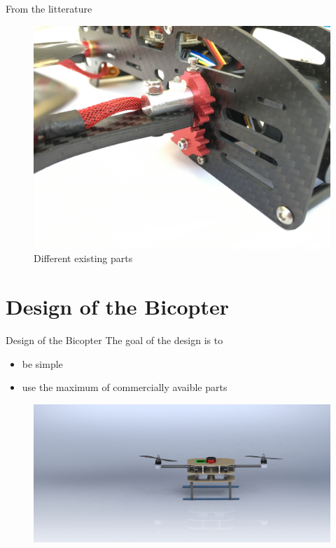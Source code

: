 \documentclass{beamer}
\begin{document}
\begin{frame}{From the litterature}
\begin{figure}
\includegraphics[scale=0.11]{pictures/bicopter3}
\caption{Different existing parts}
\end{figure}
\end{frame}

\section{Design of the Bicopter}
\begin{frame}{Design of the Bicopter}
The goal of the design is to
\begin{itemize}
\item be simple
\item use the maximum of commercially avaible parts
\end{itemize}
\begin{figure}
\includegraphics[scale=0.07]{pictures/picture4}
\end{figure}
\end{frame}
\end{document}
